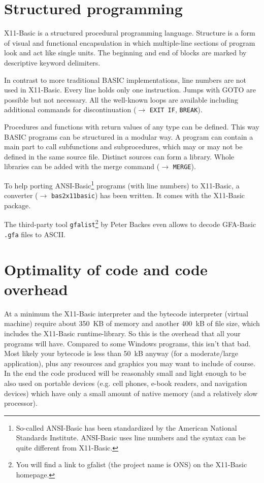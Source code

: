 \section*{Structured programming}

X11-Basic is a structured procedural programming language. Structure is a form
of visual and functional encapsulation in which multiple-line sections of
program look and act like single units. The beginning and end of blocks are
marked by descriptive keyword delimiters.

In contrast to more traditional BASIC implementations, line numbers are not
used in X11-Basic. Every line holds only one instruction. Jumps with GOTO are
possible but not necessary. All the well-known loops are available including 
additional commands for discontinuation ($\longrightarrow$ \verb|EXIT IF|, \verb|BREAK|). 

Procedures and functions with return values of any type can be defined. This way
BASIC programs can be structured in a modular way. A program can contain a main
part to call subfunctions and subprocedures, which may or may not be defined in
the same source file. Distinct sources can form a library. Whole libraries can
be added with the merge command ($\longrightarrow$ \verb|MERGE|).

To help porting ANSI-Basic\footnote{So-called ANSI-Basic has been standardized
by the American National Standards Institute. ANSI-Basic uses line numbers and
the syntax can be quite different from X11-Basic.} programs (with line numbers)
to X11-Basic, a converter ($\longrightarrow$ \verb|bas2x11basic|) has been written. It comes
with the X11-Basic package. 

The third-party tool \verb|gfalist|\footnote{You will find a link to gfalist 
(the project name is ONS) on the X11-Basic homepage.} by Peter Backes even 
allows to decode GFA-Basic \verb|.gfa|
files to ASCII.


\section*{Optimality of code and code overhead}

At a minimum the X11-Basic interpreter and the bytecode interpreter (virtual
machine) require about 350~KB of memory and another 400~kB of file size, which
includes the X11-Basic runtime-library. So this is the overhead that all your
programs will have. Compared to some Windows programs, this isn't that bad. Most
likely your bytecode is less than 50~kB anyway (for a moderate/large
application), plus any resources and graphics you may want to include of course.
In the end the code produced will be reasonably small and light enough to be
also used on portable devices (e.g. cell phones, e-book readers, and navigation
devices) which have only a small amount of native memory (and a relatively slow
processor).


